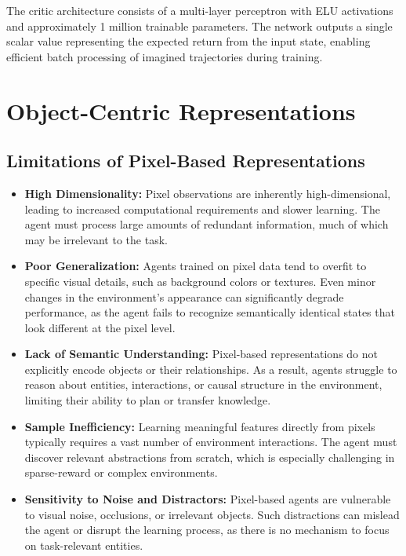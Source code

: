 \documentclass[
	english,
	ruledheaders=section,
	class=report,
	thesis={type=master},
	accentcolor=9c,
	custommargins=true,
	marginpar=false,
	parskip=half-,
	fontsize=11pt,
]{tudapub}
\begin{document}
The critic architecture consists of a multi-layer perceptron with ELU activations and approximately 1 million trainable parameters. The network outputs a single scalar value representing the expected return from the input state, enabling efficient batch processing of imagined trajectories during training.



\section{Object-Centric Representations}
\label{sec:object_centric}

\subsection{Limitations of Pixel-Based Representations}
\label{subsec:pixel_limitations}

\begin{itemize}
	\item \textbf{High Dimensionality:} Pixel observations are inherently high-dimensional, leading to increased computational requirements and slower learning. The agent must process large amounts of redundant information, much of which may be irrelevant to the task.
	\item \textbf{Poor Generalization:} Agents trained on pixel data tend to overfit to specific visual details, such as background colors or textures. Even minor changes in the environment's appearance can significantly degrade performance, as the agent fails to recognize semantically identical states that look different at the pixel level.
	\item \textbf{Lack of Semantic Understanding:} Pixel-based representations do not explicitly encode objects or their relationships. As a result, agents struggle to reason about entities, interactions, or causal structure in the environment, limiting their ability to plan or transfer knowledge.
	\item \textbf{Sample Inefficiency:} Learning meaningful features directly from pixels typically requires a vast number of environment interactions. The agent must discover relevant abstractions from scratch, which is especially challenging in sparse-reward or complex environments.
	\item \textbf{Sensitivity to Noise and Distractors:} Pixel-based agents are vulnerable to visual noise, occlusions, or irrelevant objects. Such distractions can mislead the agent or disrupt the learning process, as there is no mechanism to focus on task-relevant entities.
\end{itemize}
\end{document}
